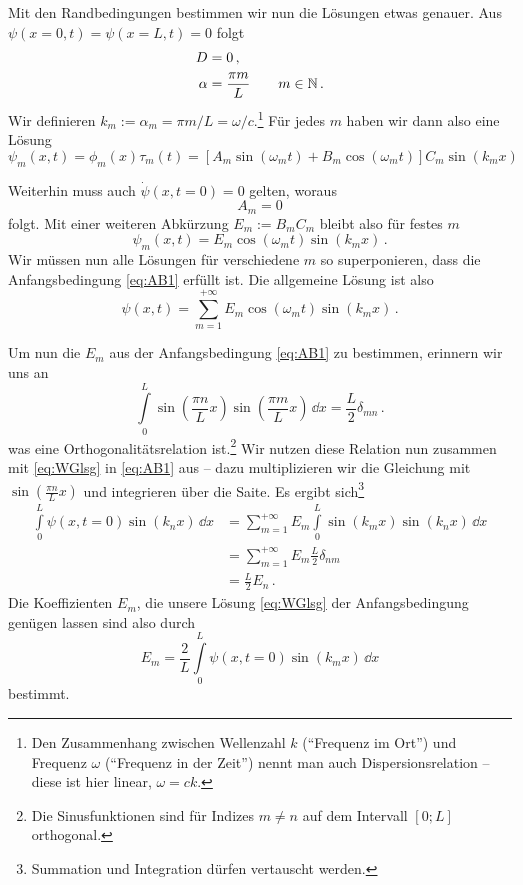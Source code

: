 \documentclass[paper=a4, fontsize=11.0pt, abstractoff, DIV12]{scrartcl}
\begin{document}
Mit den Randbedingungen bestimmen wir nun die Lösungen etwas genauer.
Aus $\psi(x=0, t) = \psi(x=L, t) = 0$ folgt
\begin{align}
D &= 0\,,\\
\alpha &= \frac{\pi m}{L}\qquad m \in \mathbb{N}\, .
\end{align}
Wir definieren $k_m:=\alpha_m=\pi m/L=\omega/c$.\footnote{Den Zusammenhang zwischen
Wellenzahl $k$ (``Frequenz im Ort'') und Frequenz $\omega$ (``Frequenz in
der Zeit'') nennt man auch Dispersionsrelation -- diese ist hier linear, $\omega = ck$.}
Für jedes $m$ haben wir dann also eine Lösung
\begin{equation}
\psi_m(x,t)=\phi_m(x)\tau_m(t) = \left[A_m\sin\left(\omega_m t\right) + B_m\cos\left(\omega_m t\right)\right]C_m\sin\left(k_m x\right)
\end{equation}

Weiterhin muss auch $\dot{\psi}(x,t=0) = 0$ gelten, woraus
\begin{equation}
A_m = 0
\end{equation}
folgt. Mit einer weiteren Abkürzung $E_m := B_m C_m$ bleibt also für festes $m$
\begin{equation}
\psi_m(x,t)= E_m\cos\left(\omega_m t\right)\sin\left(k_m x\right)\,.
\end{equation}
Wir müssen nun alle Lösungen für verschiedene $m$ so superponieren, dass die
Anfangsbedingung \eqref{eq:AB1} erfüllt ist. Die allgemeine Lösung ist also
\begin{equation}
\psi(x,t)= \sum\limits_{m=1}^{+\infty}E_m\cos\left(\omega_m t\right)\sin\left(k_m x\right)\,.
\label{eq:WGlsg}
\end{equation}

Um nun die $E_m$ aus der Anfangsbedingung \eqref{eq:AB1} zu bestimmen,
erinnern wir uns an
\begin{equation}
\int\limits_{0}^{L} \sin\left(\frac{\pi n}{L}x\right) \sin\left(\frac{\pi m}{L}x\right)\,\dd x = \frac{L}{2} \delta_{mn}\,.
\end{equation}
was eine Orthogonalitätsrelation ist.\footnote{Die Sinusfunktionen sind für
Indizes $m\ne n$ auf dem Intervall $[0;L]$ orthogonal.} Wir nutzen diese
Relation nun zusammen mit \eqref{eq:WGlsg} in \eqref{eq:AB1} aus -- dazu
multiplizieren wir die Gleichung mit $\sin\left(\frac{\pi n}{L}x\right)$ und
integrieren über die Saite. Es ergibt sich\footnote{Summation und
Integration dürfen vertauscht werden.}
\begin{align}
\int\limits_{0}^{L}\psi(x,t=0)\sin(k_n x)\,\dd x &= \sum\limits_{m=1}^{+\infty}E_m\int\limits_{0}^{L}\sin(k_m x)\sin(k_n x)\,\dd x\nonumber\\
&= \sum\limits_{m=1}^{+\infty} E_m \frac{L}{2} \delta_{nm}\nonumber\\
&=\frac{L}{2}E_n\,.
\end{align}
Die Koeffizienten $E_m$, die unsere Lösung \eqref{eq:WGlsg} der Anfangsbedingung
genügen lassen sind also durch
\begin{equation}
E_m = \frac{2}{L}\int\limits_{0}^{L}\psi(x,t=0)\sin(k_m x)\,\dd x
\end{equation}
bestimmt.
\end{document}
